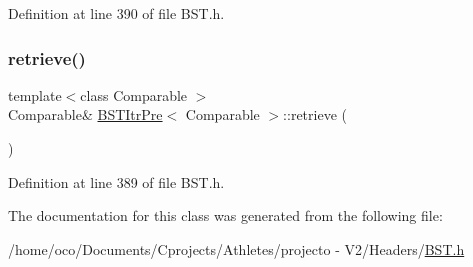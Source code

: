 Definition at line 390 of file B\+S\+T.\+h.

\hypertarget{class_b_s_t_itr_pre_af40033e97f63bf025c2e33a9fdce4c43}{}\label{class_b_s_t_itr_pre_af40033e97f63bf025c2e33a9fdce4c43} 
\subsubsection{\texorpdfstring{retrieve()}{retrieve()}}
{\footnotesize\ttfamily template$<$class Comparable $>$ \\
Comparable\& \hyperlink{class_b_s_t_itr_pre}{B\+S\+T\+Itr\+Pre}$<$ Comparable $>$\+::retrieve (\begin{DoxyParamCaption}{ }\end{DoxyParamCaption})\hspace{0.3cm}{\ttfamily [inline]}}



Definition at line 389 of file B\+S\+T.\+h.



The documentation for this class was generated from the following file\+:\begin{DoxyCompactItemize}
\item 
/home/oco/\+Documents/\+Cprojects/\+Athletes/projecto -\/ V2/\+Headers/\hyperlink{_b_s_t_8h}{B\+S\+T.\+h}\end{DoxyCompactItemize}
